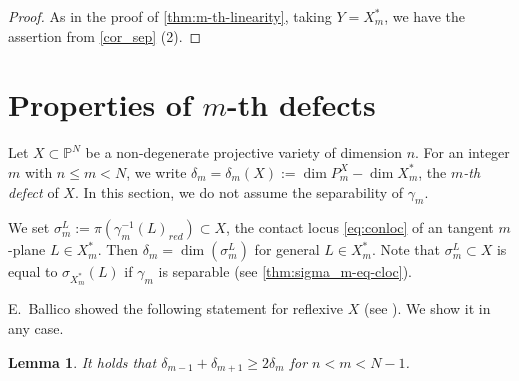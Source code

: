 \documentclass[a4paper,12pt]{amsart}
\theoremstyle{plain}
\newtheorem{lem}[lem]{Lemma}
\theoremstyle{definition}
\begin{document}
\begin{proof}
  As in the proof of \autoref{thm:m-th-linearity},
  taking $Y = X_{m}^*$, we have the assertion
  from \autoref{cor_sep} (2).
\end{proof}

\section{Properties of $m$-th defects}

Let $X \subset {{\mathbb{P}}^N}$ be a non-degenerate projective variety of dimension $n$.
For an integer $m$ with $n  {\leqslant} m < N$,
we write $\delta_{m} = \delta_{m}(X) := \dim {P_m^{X}} - \dim X_m^*$, the \emph{$m$-th defect} of $X$.
In this section,
we do not assume the separability of $\gamma_m$.

We set $\sigma_m^{L} := \pi(\gamma_m^{-1}(L)_{red}) \subset X$,
the contact locus \autoref{eq:conloc} of an tangent $m$-plane $L \in X_{m}^*$.
Then $\delta_m = \dim(\sigma_m^{L})$ for general $L \in X_{m}^*$.
Note that $\sigma_m^{L} \subset X$ is equal to $\sigma_{X_m^*}(L)$ if $\gamma_m$ is separable (see \autoref{thm:sigma_m-eq-cloc}).

E.~Ballico showed the following statement
for reflexive $X$ (see \cite[Proposition 1]{Ballico}).
We show it in any case.

\begin{lem}\label{thm:del_m-inc}
  It holds that
  $\delta_{m-1}+\delta_{m+1} {\geqslant} 2 \delta_{m}$ for $n < m < N-1$.
\end{lem}
\end{document}
